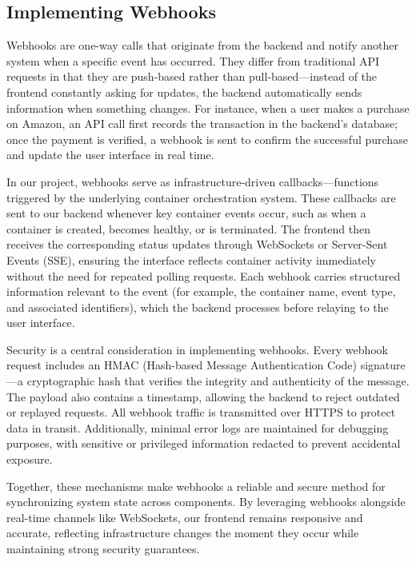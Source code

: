\documentclass[12pt,titlepage]{article}
\begin{document}
\subsection{Implementing Webhooks}
Webhooks are one-way calls that originate from the backend and notify another system when a specific event has occurred. They differ from traditional API requests in that they are push-based rather than pull-based—instead of the frontend constantly asking for updates, the backend automatically sends information when something changes. For instance, when a user makes a purchase on Amazon, an API call first records the transaction in the backend’s database; once the payment is verified, a webhook is sent to confirm the successful purchase and update the user interface in real time.

In our project, webhooks serve as infrastructure-driven callbacks—functions triggered by the underlying container orchestration system. These callbacks are sent to our backend whenever key container events occur, such as when a container is created, becomes healthy, or is terminated. The frontend then receives the corresponding status updates through WebSockets or Server-Sent Events (SSE), ensuring the interface reflects container activity immediately without the need for repeated polling requests. Each webhook carries structured information relevant to the event (for example, the container name, event type, and associated identifiers), which the backend processes before relaying to the user interface.

Security is a central consideration in implementing webhooks. Every webhook request includes an HMAC (Hash-based Message Authentication Code) signature—a cryptographic hash that verifies the integrity and authenticity of the message. The payload also contains a timestamp, allowing the backend to reject outdated or replayed requests. All webhook traffic is transmitted over HTTPS to protect data in transit. Additionally, minimal error logs are maintained for debugging purposes, with sensitive or privileged information redacted to prevent accidental exposure.

Together, these mechanisms make webhooks a reliable and secure method for synchronizing system state across components. By leveraging webhooks alongside real-time channels like WebSockets, our frontend remains responsive and accurate, reflecting infrastructure changes the moment they occur while maintaining strong security guarantees.
\end{document}

